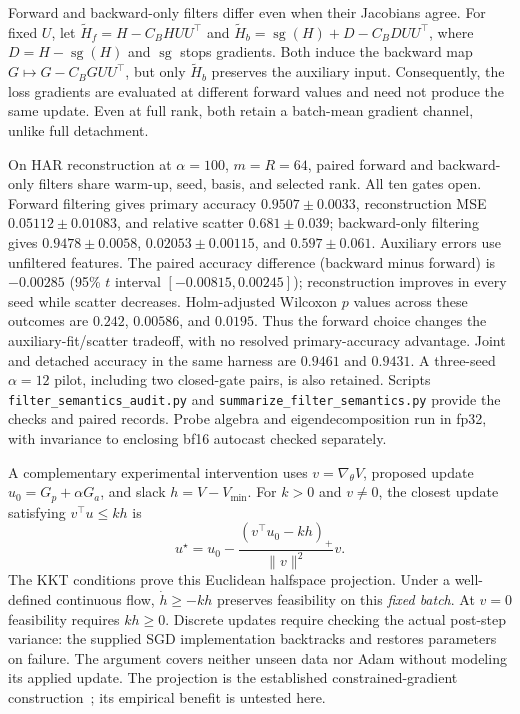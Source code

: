 \documentclass{article}
\begin{document}
Forward and backward-only filters differ even when their Jacobians agree. For fixed $U$, let $\widetilde H_f=H-C_BHUU^\top$ and $\widetilde H_b=\operatorname{sg}(H)+D-C_BDUU^\top$, where $D=H-\operatorname{sg}(H)$ and $\operatorname{sg}$ stops gradients. Both induce the backward map $G\mapsto G-C_BGUU^\top$, but only $\widetilde H_b$ preserves the auxiliary input. Consequently, the loss gradients are evaluated at different forward values and need not produce the same update. Even at full rank, both retain a batch-mean gradient channel, unlike full detachment.

On HAR reconstruction at $\alpha=100$, $m=R=64$, paired forward and backward-only filters share warm-up, seed, basis, and selected rank. All ten gates open. Forward filtering gives primary accuracy $0.9507\pm0.0033$, reconstruction MSE $0.05112\pm0.01083$, and relative scatter $0.681\pm0.039$; backward-only filtering gives $0.9478\pm0.0058$, $0.02053\pm0.00115$, and $0.597\pm0.061$. Auxiliary errors use unfiltered features. The paired accuracy difference (backward minus forward) is $-0.00285$ (95\% $t$ interval $[-0.00815,0.00245]$); reconstruction improves in every seed while scatter decreases. Holm-adjusted Wilcoxon $p$ values across these outcomes are $0.242$, $0.00586$, and $0.0195$. Thus the forward choice changes the auxiliary-fit/scatter tradeoff, with no resolved primary-accuracy advantage. Joint and detached accuracy in the same harness are $0.9461$ and $0.9431$. A three-seed $\alpha=12$ pilot, including two closed-gate pairs, is also retained. Scripts \texttt{filter\_semantics\_audit.py} and \texttt{summarize\_filter\_semantics.py} provide the checks and paired records. Probe algebra and eigendecomposition run in fp32, with invariance to enclosing bf16 autocast checked separately.

A complementary experimental intervention uses $v=\nabla_\theta V$, proposed update $u_0=G_p+\alpha G_a$, and slack $h=V-V_{\min}$. For $k>0$ and $v\ne0$, the closest update satisfying $v^\top u\le kh$ is
\[
u^\star=u_0-\frac{(v^\top u_0-kh)_+}{\|v\|^2}v.
\]
The KKT conditions prove this Euclidean halfspace projection. Under a well-defined continuous flow, $\dot h\ge-kh$ preserves feasibility on this \emph{fixed batch}. At $v=0$ feasibility requires $kh\ge0$. Discrete updates require checking the actual post-step variance: the supplied SGD implementation backtracks and restores parameters on failure. The argument covers neither unseen data nor Adam without modeling its applied update. The projection is the established constrained-gradient construction~\citep{allibhoy2024safe}; its empirical benefit is untested here.
\end{document}
